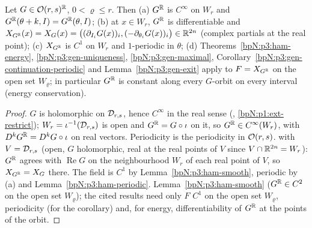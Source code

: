 \begin{lemma}\label{bpN:p7:real-system}
Let $G\in\mathcal O(r,s)^{\mathbb{R}}$, $0<\varrho\le r$. Then (a) $G^{\mathbb{R}}$ is $C^\infty$ on $W_r$ and $G^{\mathbb{R}}(\theta+k,I)=G^{\mathbb{R}}(\theta,I)$; (b) at $x\in W_r$, $G^{\mathbb{R}}$ is differentiable and $X_{G^{\mathbb{R}}}(x)=X_G(x)=\bigl((\partial_{I_i}G(x))_i,(-\partial_{\theta_i}G(x))_i\bigr)\in\mathbb{R}^{2n}$ (complex partials at the real point); (c) $X_{G^{\mathbb{R}}}$ is $C^1$ on $W_r$ and $1$-periodic in $\theta$; (d) Theorems~\ref{bpN:p3:ham-energy}, \ref{bpN:p3:gen-uniqueness}, \ref{bpN:p3:gen-maximal}, Corollary~\ref{bpN:p3:gen-continuation-periodic} and Lemma~\ref{bpN:p3:gen-exit} apply to $F=X_{G^{\mathbb{R}}}$ on the open set $W_\varrho$; in particular $G^{\mathbb{R}}$ is constant along every $G$-orbit on every interval (energy conservation).
\end{lemma}
\begin{proof}
\label{stepN:p7:rs-smooth} $G$ is holomorphic on $\mathcal D_{r,s}$, hence $C^\infty$ in the real sense (, \ref{bpN:p1:ext-restrict}); $W_r=\iota^{-1}(\mathcal D_{r,s})$ is open and $G^{\mathbb{R}}=G\circ\iota$ on it, so $G^{\mathbb{R}}\in C^\infty(W_r)$, with $D^kG^{\mathbb{R}}=D^kG\circ\iota$ on real vectors. Periodicity is the periodicity in $\mathcal O(r,s)$.
\label{stepN:p7:rs-field}  with $V=\mathcal D_{r,s}$ (open, $G$ holomorphic, real at the real points of $V$ since $V\cap\mathbb{R}^{2n}=W_r$): $G^{\mathbb{R}}$ agrees with $\operatorname{Re}G$ on the neighbourhood $W_r$ of each real point of $V$, so $X_{G^{\mathbb{R}}}=X_G$ there. The field is $C^1$ by Lemma~\ref{bpN:p3:ham-smooth}, periodic by (a) and Lemma~\ref{bpN:p3:ham-periodic}.
 Lemma~\ref{bpN:p3:ham-smooth} ($G^{\mathbb{R}}\in C^2$ on the open set $W_\varrho$); the cited results need only $F$ $C^1$ on the open set $W_\varrho$, periodicity (for the corollary) and, for energy, differentiability of $G^{\mathbb{R}}$ at the points of the orbit.
\end{proof}

